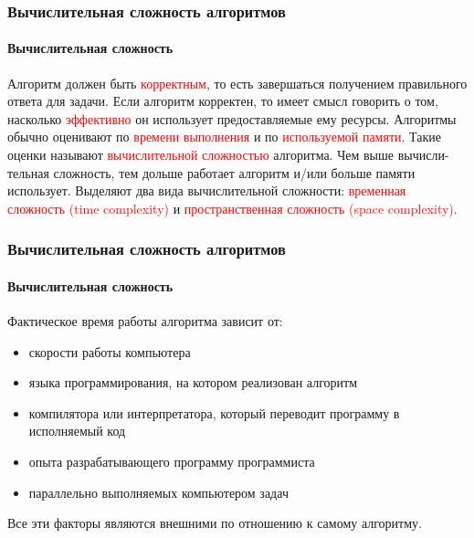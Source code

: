 \documentclass[aspectratio=169]{beamer}
\begin{document}
\begin{frame}
\frametitle{Вычислительная сложность алгоритмов}
\framesubtitle{Вычислительная сложность}
\justifying
Алгоритм должен быть \textcolor{red}{корректным}, то есть завершаться получением правильного ответа для задачи. Если алгоритм корректен, то имеет смысл говорить о том, насколько \textcolor{red}{эффективно} он использует предоставляемые ему ресурсы. \newline\newline
Алгоритмы обычно оценивают по \textcolor{red}{времени выполнения} и по \textcolor{red}{используемой памяти}. \newline\newline
Такие оценки называют \textcolor{red}{вычислительной сложностью} алгоритма. Чем выше вычисли-тельная сложность, тем дольше работает алгоритм и/или больше памяти использует. \newline\newline
Выделяют два вида вычислительной сложности: \textcolor{red}{временная сложность (time complexity)} и \textcolor{red}{пространственная сложность (space complexity)}.

\end{frame}	

\begin{frame}
\frametitle{Вычислительная сложность алгоритмов}
\framesubtitle{Вычислительная сложность}
\justifying
Фактическое время работы алгоритма зависит от:
\begin{itemize}
\item{скорости работы компьютера}
\item{языка программирования, на котором реализован алгоритм}
\item{компилятора или интерпретатора, который переводит программу в исполняемый код}
\item{опыта разрабатывающего программу программиста}
\item{параллельно выполняемых компьютером задач\newline\newline}
\end{itemize}

Все эти факторы являются внешними по отношению к самому алгоритму.
\end{frame}	
\end{document}
